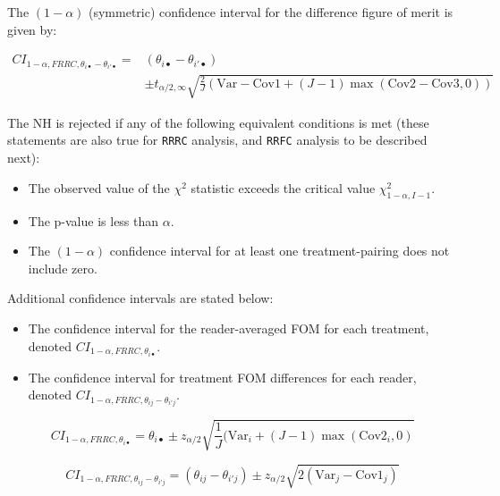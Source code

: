 \documentclass[
]{book}
\providecommand{\tightlist}{%
  \setlength{\itemsep}{0pt}\setlength{\parskip}{0pt}}
\begin{document}
The \((1-\alpha)\) (symmetric) confidence interval for the difference figure of merit is given by:

\begin{equation}
\begin{split}
CI_{1-\alpha,FRRC,\theta_{i \bullet} - \theta_{i' \bullet}} =&(\theta_{i \bullet} - \theta_{i' \bullet}) \\ 
&\pm t_{\alpha/2, \infty}\sqrt{\textstyle\frac{2}{J}(\text{Var}-\text{Cov1}+(J-1)\max(\text{Cov2}-\text{Cov3},0))}
\end{split}
\label{eq:CIDiffFomFRRC-OR}
\end{equation}

The NH is rejected if any of the following equivalent conditions is met (these statements are also true for \texttt{RRRC} analysis, and \texttt{RRFC} analysis to be described next):

\begin{itemize}
\tightlist
\item
  The observed value of the \(\chi^2\) statistic exceeds the critical value \(\chi^2_{1-\alpha,I-1}\).
\item
  The p-value is less than \(\alpha\).
\item
  The \((1-\alpha)\) confidence interval for at least one treatment-pairing does not include zero.
\end{itemize}

Additional confidence intervals are stated below:

\begin{itemize}
\tightlist
\item
  The confidence interval for the reader-averaged FOM for each treatment, denoted \(CI_{1-\alpha,FRRC,\theta_{i \bullet}}\).
\item
  The confidence interval for treatment FOM differences for each reader, denoted \(CI_{1-\alpha,FRRC,\theta_{i j} - \theta_{i' j}}\).
\end{itemize}

\begin{equation}
CI_{1-\alpha,FRRC,\theta_{i \bullet}} = \theta_{i \bullet} \pm z_{\alpha/2}\sqrt{\textstyle\frac{1}{J}(\text{Var}_i+(J-1)\max(\text{Cov2}_i,0)}
\label{eq:CIIndTrtFomFRRC-OR}
\end{equation}

\begin{equation}
CI_{1-\alpha,FRRC,\theta_{i j} - \theta_{i' j}} = (\theta_{i j} - \theta_{i' j}) \pm z_{\alpha/2}\sqrt{2(\text{Var}_j - \text{Cov1}_j)}
\label{eq:CIIndRdrDiffFomFRRC-OR}
\end{equation}
\end{document}

